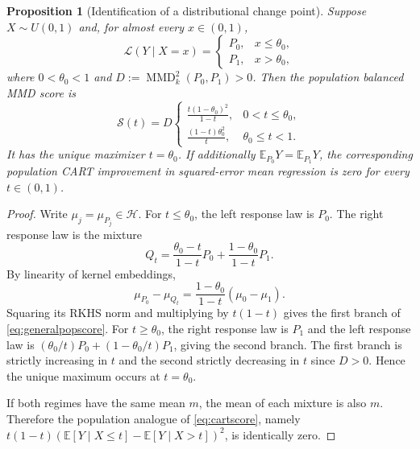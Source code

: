 \documentclass[12pt,a4paper]{article}
\newtheorem{proposition}{Proposition}
\newcommand{\E}{\mathbb E}
\newcommand{\calH}{\mathcal H}
\newcommand{\MMD}{\operatorname{MMD}}
\newcommand{\1}{\mathbf 1}
\begin{document}
\begin{proposition}[Identification of a distributional change point]\label{prop:ident}
Suppose $X\sim U(0,1)$ and, for almost every $x\in(0,1)$,
\[
 \mathcal L(Y\mid X=x)=\begin{cases}
 P_0,&x\le\theta_0,\\
 P_1,&x>\theta_0,
 \end{cases}
\]
where $0<\theta_0<1$ and $D:=\MMD_k^2(P_0,P_1)>0$. Then the population balanced MMD score is
\begin{equation}\label{eq:generalpopscore}
 \mathcal S(t)=D\begin{cases}
 \displaystyle \frac{t(1-\theta_0)^2}{1-t},&0<t\le\theta_0,\\[6pt]
 \displaystyle \frac{(1-t)\theta_0^2}{t},&\theta_0\le t<1.
 \end{cases}
\end{equation}
It has the unique maximizer $t=\theta_0$. If additionally $\E_{P_0}Y=\E_{P_1}Y$, the corresponding population CART improvement in squared-error mean regression is zero for every $t\in(0,1)$.
\end{proposition}
\begin{proof}
Write $\mu_j=\mu_{P_j}\in\calH$. For $t\le\theta_0$, the left response law is $P_0$. The right response law is the mixture
\[
 Q_t=\frac{\theta_0-t}{1-t}P_0+\frac{1-\theta_0}{1-t}P_1.
\]
By linearity of kernel embeddings,
\[
 \mu_{P_0}-\mu_{Q_t}=\frac{1-\theta_0}{1-t}(\mu_0-\mu_1).
\]
Squaring its RKHS norm and multiplying by $t(1-t)$ gives the first branch of \eqref{eq:generalpopscore}. For $t\ge\theta_0$, the right response law is $P_1$ and the left response law is $(\theta_0/t)P_0+(1-\theta_0/t)P_1$, giving the second branch. The first branch is strictly increasing in $t$ and the second strictly decreasing in $t$ since $D>0$. Hence the unique maximum occurs at $t=\theta_0$.

If both regimes have the same mean $m$, the mean of each mixture is also $m$. Therefore the population analogue of \eqref{eq:cartscore}, namely $t(1-t)(\E[Y\mid X\le t]-\E[Y\mid X>t])^2$, is identically zero.
\end{proof}
\end{document}
